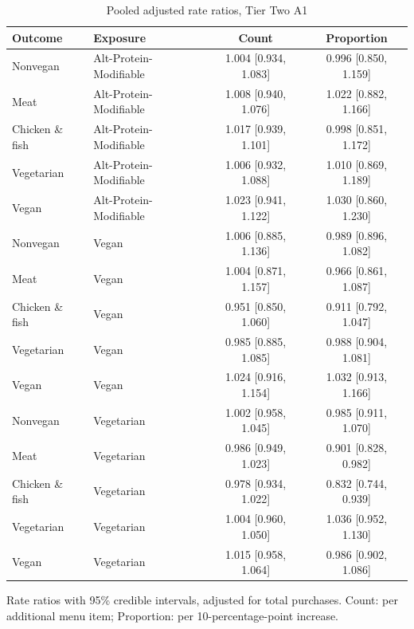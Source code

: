 
\begin{table}[H]
\centering
\caption{Pooled adjusted rate ratios, Tier Two A1}
\label{tab:rr_t2_a1}
\begin{tabular}{llcc}
\toprule
Outcome & Exposure & Count & Proportion \\
\midrule
Nonvegan & Alt-Protein-Modifiable & 1.004 [0.934, 1.083] & 0.996 [0.850, 1.159] \\
Meat & Alt-Protein-Modifiable & 1.008 [0.940, 1.076] & 1.022 [0.882, 1.166] \\
Chicken \& fish & Alt-Protein-Modifiable & 1.017 [0.939, 1.101] & 0.998 [0.851, 1.172] \\
Vegetarian & Alt-Protein-Modifiable & 1.006 [0.932, 1.088] & 1.010 [0.869, 1.189] \\
Vegan & Alt-Protein-Modifiable & 1.023 [0.941, 1.122] & 1.030 [0.860, 1.230] \\
Nonvegan & Vegan & 1.006 [0.885, 1.136] & 0.989 [0.896, 1.082] \\
Meat & Vegan & 1.004 [0.871, 1.157] & 0.966 [0.861, 1.087] \\
Chicken \& fish & Vegan & 0.951 [0.850, 1.060] & 0.911 [0.792, 1.047] \\
Vegetarian & Vegan & 0.985 [0.885, 1.085] & 0.988 [0.904, 1.081] \\
Vegan & Vegan & 1.024 [0.916, 1.154] & 1.032 [0.913, 1.166] \\
Nonvegan & Vegetarian & 1.002 [0.958, 1.045] & 0.985 [0.911, 1.070] \\
Meat & Vegetarian & 0.986 [0.949, 1.023] & 0.901 [0.828, 0.982] \\
Chicken \& fish & Vegetarian & 0.978 [0.934, 1.022] & 0.832 [0.744, 0.939] \\
Vegetarian & Vegetarian & 1.004 [0.960, 1.050] & 1.036 [0.952, 1.130] \\
Vegan & Vegetarian & 1.015 [0.958, 1.064] & 0.986 [0.902, 1.086] \\
\bottomrule
\end{tabular}
\par\smallskip\footnotesize Rate ratios with 95\% credible intervals, adjusted for total purchases. Count: per additional menu item; Proportion: per 10-percentage-point increase.
\end{table}

